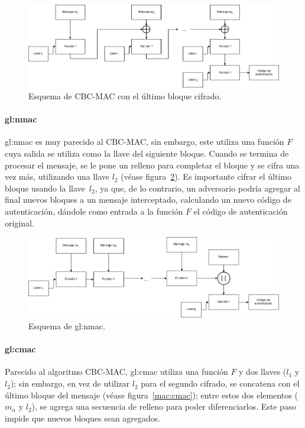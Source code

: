 \begin{figure}
  \begin{center}
    \includegraphics[width=0.9\linewidth]{diagramas/cbcmaclb.png}
    \caption{Esquema de CBC-MAC con el último bloque cifrado.}
    \label{mac:cbc2}
  \end{center}
\end{figure}

\paragraph{\texorpdfstring{\acrlong{gl:nmac}}{Nested MAC}}
\gls{gl:nmac} es muy parecido al CBC-MAC, sin embargo, este utiliza una
función $F$ cuya salida se utiliza como la llave del siguiente bloque. Cuando
se termina de procesar el mensaje, se le pone un relleno para completar el
bloque y se cifra una vez más, utilizando una llave $l_2$ (véase
figura~\ref{mac:nmac}). Es importante cifrar el último bloque usando la
llave~$l_2$, ya que, de lo contrario, un adversario podría agregar al final
nuevos bloques a un mensaje interceptado, calculando un nuevo código de
autenticación, dándole como entrada a la función $F$ el código de autenticación
original.

\begin{figure}
  \begin{center}
    \includegraphics[width=0.9\linewidth]{diagramas/nmac.png}
    \caption{Esquema de \gls{gl:nmac}.}
    \label{mac:nmac}
  \end{center}
\end{figure}

\paragraph{\texorpdfstring{\acrlong{gl:cmac}}{Cipher-based MAC}}
Parecido al algoritmo CBC-MAC, \gls{gl:cmac} utiliza una función $F$ y dos
llaves ($l_1$ y $l_2$); sin embargo, en vez de utilizar $l_2$ para el segundo
cifrado, se concatena con el último bloque del mensaje (véase
figura~\ref{mac:cmac}); entre estos dos elementos ($m_n$ y $l_2$), se agrega una
secuencia de relleno para poder diferenciarlos. Este paso impide que nuevos
bloques sean agregados.

